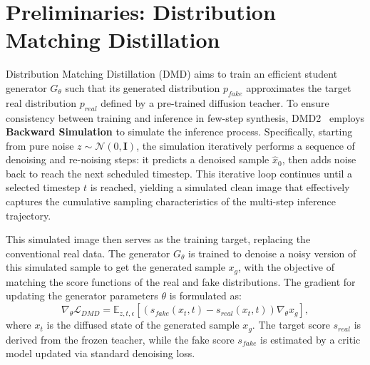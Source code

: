 \section{Preliminaries: Distribution Matching Distillation}
\label{sec:preliminaries}

Distribution Matching Distillation (DMD) aims to train an efficient student generator $G_\theta$ such that its generated distribution $p_{fake}$ approximates the target real distribution $p_{real}$ defined by a pre-trained diffusion teacher. To ensure consistency between training and inference in few-step synthesis, DMD2~\cite{dmd2} employs \textbf{Backward Simulation} to simulate the inference process. Specifically, starting from pure noise $z \sim \mathcal{N}(0, \mathbf{I})$, the simulation iteratively performs a sequence of denoising and re-noising steps: it predicts a denoised sample $\hat{x}_0$, then adds noise back to reach the next scheduled timestep. This iterative loop continues until a selected timestep $t$ is reached, yielding a simulated clean image that effectively captures the cumulative sampling characteristics of the multi-step inference trajectory. 

This simulated image then serves as the training target, replacing the conventional real data. The generator $G_\theta$ is trained to denoise a noisy version of this simulated sample to get the generated sample $x_g$, with the objective of matching the score functions of the real and fake distributions. The gradient for updating the generator parameters $\theta$ is formulated as:
\begin{equation}
    \label{eq: dmd}
    \nabla_\theta \mathcal{L}_{DMD} = \mathbb{E}_{z, t, \epsilon} \left[ \left( s_{fake}(x_t, t) - s_{real}(x_t, t) \right) \nabla_\theta x_g \right],
\end{equation}
where $x_t$ is the diffused state of the generated sample $x_g$. The target score $s_{real}$ is derived from the frozen teacher, while the fake score $s_{fake}$ is estimated by a critic model updated via standard denoising loss. 
